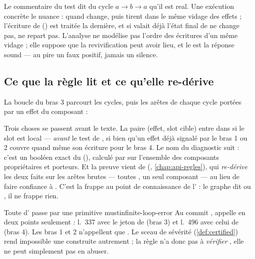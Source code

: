 \begin{remarque}
Le commentaire du test  dit du cycle $a \to b \to a$ qu'il est \og real\fg. Une exécution concrète le nuance : quand  change,  puis  tirent dans le même vidage des effets ; l'écriture de  () est traitée la dernière, et si  valait déjà  l'état final de  ne change pas,  ne repart pas. L'analyse ne modélise pas l'ordre des écritures d'un même vidage ; elle suppose que la revivification peut avoir lieu, et le \Warning{} est la réponse sound --- au pire un faux positif, jamais un silence.
\end{remarque}

\subsection{Ce que la règle lit et ce qu'elle re-dérive}

La boucle du bras 3 parcourt les cycles, puis les arêtes de chaque cycle portées par un effet du composant :


Trois choses se passent avant le texte. La paire (effet, slot cible) entre dans  si le slot est local --- \emph{avant} le test de , si bien qu'un effet déjà signalé par le bras 1 ou 2 couvre quand même son écriture pour le bras 4. Le nom du diagnostic suit  : c'est un booléen exact du  (), calculé par  sur l'ensemble des composants propriétaires et porteurs. Et la preuve vient de  (, \cref{chap:api-regles}), qui \emph{re-dérive} les deux faits sur les arêtes brutes --- toutes , un seul composant --- au lieu de faire confiance à . C'est la frappe \og au point de connaissance\fg{} de l' : le graphe dit  ou , il ne frappe rien.

\begin{invariant}{Toute \Error{} d' passe par une primitive must}{infinite-loop-error}
Au commit \snapshotCommit,  appelle  en deux points seulement : l.~337 avec le jeton de  (bras 3) et l.~496 avec celui de  (bras 4). Les bras 1 et 2 n'appellent que . Le sceau de sévérité (\cref{def:certified}) rend impossible une \Error{} construite autrement ; la règle n'a donc pas à \emph{vérifier} , elle ne peut simplement pas en abuser.
\end{invariant}

